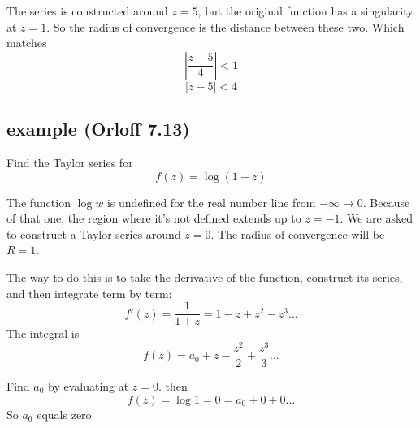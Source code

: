 \documentclass[11pt, oneside]{article}
\begin{document}
The series is constructed around $z = 5$, but the original function has a singularity at $z = 1$.  So the radius of convergence is the distance between these two.  Which matches
\[ |\frac{z-5}{4}| < 1 \]
\[ |z-5| < 4 \]

\subsection*{example (Orloff 7.13)}

Find the Taylor series for 
\[ f(z) = \log(1 + z) \]

The function $\log w$ is undefined for the real number line from $- \infty \rightarrow 0$.  Because of that one, the region where it's not defined extends up to $z = -1$.  We are asked to construct a Taylor series around $z=0$.  The radius of convergence will be $R = 1$.

The way to do this is to take the derivative of the function, construct its series, and then integrate term by term:
\[ f'(z) = \frac{1}{1 + z} = 1 - z + z^2 - z^3 \dots \]
The integral is
\[ f(z) = a_0 + z - \frac{z^2}{2} + \frac{z^3}{3} \dots \]

Find $a_0$ by evaluating at $z = 0$.  then
\[ f(z) = \log 1 = 0 = a_0 + 0 + 0 \dots \]
So $a_0$ equals zero.
\end{document}

